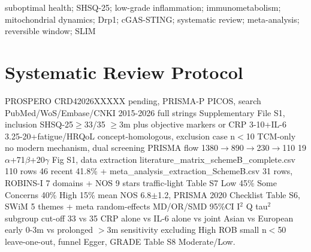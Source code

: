 \documentclass[review]{elsarticle}
\begin{document}
\begin{frontmatter}
\begin{abstract}
Conclusion: Suboptimal health is reversible pre-disease driven by low-grade inflammation and immune-metabolic reprogramming with mitochondrial dynamics as upstream. SLIM proposes quantitative reversible continuum health CRP$<$1 IL-6$<$1.5 fusion dominant$\rightarrow$early 0-3m mild fission OXPHOS$\downarrow$10-20\% CRP1-3 fully reversible$\rightarrow$prolonged $>$3m excessive fission OXPHOS$\downarrow$20-40\% CRP3-10 mtDNA cGAS-STING partially reversible$\rightarrow$disease $>$50\% difficult reversible Goldilocks, and time-window-target-delivery matrix early exercise AMPK-AKAP1-Ser637 sleep circadian-Drp1 butyrate Mfn2 prolonged fasting SIRT1-PGC-1$\alpha$ MitoQ ROS$\downarrow$ for preventive intervention.
\end{abstract}
\begin{keyword}
suboptimal health; SHSQ-25; low-grade inflammation; immunometabolism; mitochondrial dynamics; Drp1; cGAS-STING; systematic review; meta-analysis; reversible window; SLIM
\end{keyword}
\end{frontmatter}

\linenumbers

\section{Systematic Review Protocol}
PROSPERO CRD42026XXXXX pending, PRISMA-P PICOS, search PubMed/WoS/Embase/CNKI 2015-2026 full strings Supplementary File S1, inclusion SHSQ-25$\geq$33/35 $\geq$3m plus objective markers or CRP 3-10+IL-6 3.25-20+fatigue/HRQoL concept-homologous, exclusion case n$<$10 TCM-only no modern mechanism, dual screening PRISMA flow 1380$\rightarrow$890$\rightarrow$230$\rightarrow$110 19$\alpha$+71$\beta$+20$\gamma$ Fig S1, data extraction literature\_matrix\_schemeB\_complete.csv 110 rows 46 recent 41.8\% + meta\_analysis\_extraction\_SchemeB.csv 31 rows, ROBINS-I 7 domains + NOS 9 stars traffic-light Table S7 Low 45\% Some Concerns 40\% High 15\% mean NOS 6.8$\pm$1.2, PRISMA 2020 Checklist Table S6, SWiM 5 themes + meta random-effects MD/OR/SMD 95\%CI I$^2$ Q tau$^2$ subgroup cut-off 33 vs 35 CRP alone vs IL-6 alone vs joint Asian vs European early 0-3m vs prolonged $>$3m sensitivity excluding High ROB small n$<$50 leave-one-out, funnel Egger, GRADE Table S8 Moderate/Low.
\end{document}
